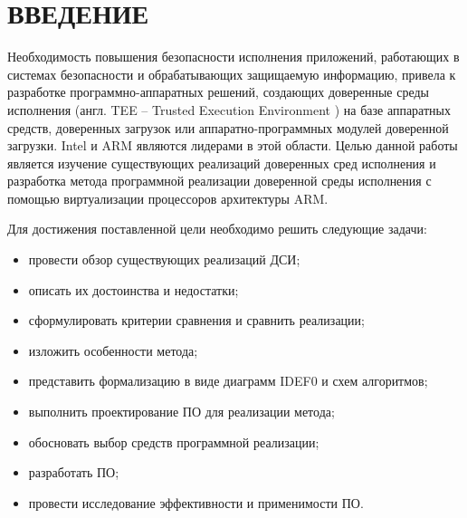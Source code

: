 \section*{ВВЕДЕНИЕ}

Необходимость повышения безопасности исполнения приложений, работающих в системах безопасности и обрабатывающих защищаемую информацию, привела к разработке программно-аппаратных решений, создающих доверенные среды исполнения (англ. TEE -- Trusted Execution Environment \cite{tee}) на базе аппаратных средств, доверенных загрузок или аппаратно-программных модулей доверенной загрузки. Intel \cite{intel} и ARM \cite{arm} являются лидерами в этой области. Целью данной работы является изучение существующих реализаций доверенных сред исполнения и разработка метода программной реализации доверенной среды исполнения с помощью виртуализации процессоров архитектуры ARM.

Для достижения поставленной цели необходимо решить следующие задачи:

\begin{itemize}
	\item провести обзор существующих реализаций ДСИ;
	\item описать их достоинства и недостатки;
	\item сформулировать критерии сравнения и сравнить реализации;
	\item изложить особенности метода;
	\item представить формализацию в виде диаграмм IDEF0 и схем алгоритмов;
	\item выполнить проектирование ПО для реализации метода;
	\item обосновать выбор средств программной реализации;
	\item разработать ПО;
	\item провести исследование эффективности и применимости ПО.
\end{itemize}

\pagebreak
